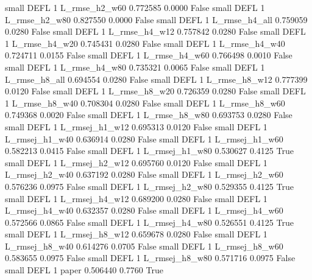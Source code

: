      small     DEFL                 1  L_rmse_h2_w60   0.772585      0.0000   False
     small     DEFL                 1  L_rmse_h2_w80   0.827550      0.0000   False
     small     DEFL                 1  L_rmse_h4_all   0.759059      0.0280   False
     small     DEFL                 1  L_rmse_h4_w12   0.757842      0.0280   False
     small     DEFL                 1  L_rmse_h4_w20   0.745431      0.0280   False
     small     DEFL                 1  L_rmse_h4_w40   0.724711      0.0155   False
     small     DEFL                 1  L_rmse_h4_w60   0.766498      0.0010   False
     small     DEFL                 1  L_rmse_h4_w80   0.735321      0.0065   False
     small     DEFL                 1  L_rmse_h8_all   0.694554      0.0280   False
     small     DEFL                 1  L_rmse_h8_w12   0.777399      0.0120   False
     small     DEFL                 1  L_rmse_h8_w20   0.726359      0.0280   False
     small     DEFL                 1  L_rmse_h8_w40   0.708304      0.0280   False
     small     DEFL                 1  L_rmse_h8_w60   0.749368      0.0020   False
     small     DEFL                 1  L_rmse_h8_w80   0.693753      0.0280   False
     small     DEFL                 1 L_rmsej_h1_w12   0.695313      0.0120   False
     small     DEFL                 1 L_rmsej_h1_w40   0.636914      0.0280   False
     small     DEFL                 1 L_rmsej_h1_w60   0.582213      0.0415   False
     small     DEFL                 1 L_rmsej_h1_w80   0.530627      0.4125    True
     small     DEFL                 1 L_rmsej_h2_w12   0.695760      0.0120   False
     small     DEFL                 1 L_rmsej_h2_w40   0.637192      0.0280   False
     small     DEFL                 1 L_rmsej_h2_w60   0.576236      0.0975   False
     small     DEFL                 1 L_rmsej_h2_w80   0.529355      0.4125    True
     small     DEFL                 1 L_rmsej_h4_w12   0.689200      0.0280   False
     small     DEFL                 1 L_rmsej_h4_w40   0.632357      0.0280   False
     small     DEFL                 1 L_rmsej_h4_w60   0.572566      0.0865   False
     small     DEFL                 1 L_rmsej_h4_w80   0.526551      0.4125    True
     small     DEFL                 1 L_rmsej_h8_w12   0.659678      0.0280   False
     small     DEFL                 1 L_rmsej_h8_w40   0.614276      0.0705   False
     small     DEFL                 1 L_rmsej_h8_w60   0.583655      0.0975   False
     small     DEFL                 1 L_rmsej_h8_w80   0.571716      0.0975   False
     small     DEFL                 1          paper   0.506440      0.7760    True
